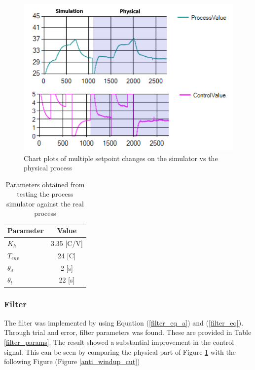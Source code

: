 \documentclass[conference]{IEEEtran}
\begin{document}
\begin{figure}[H]
    \centering
    \includegraphics[scale=0.4]{media/sim_vs_real.png}
    \caption{Chart plots of multiple setpoint changes on the simulator vs the physical process}
    \label{sim_vs_real}
\end{figure}

\begin{table}[H]
    \centering
    \begin{tabular}{ |l|c| }
        \hline
        Parameter & Value \\ 
        \hline \hline
        $K_h$ & 3.35 [C/V]\\
        $T_{env}$ & 24 [C]\\
        $\theta_d$ & 2 [s]\\
        $\theta_t$ & 22 [s]\\
        \hline
    \end{tabular}
    \vspace{5pt}
    \caption{Parameters obtained from testing the process simulator against the real process}
    \label{air_heat_model_params}
\end{table}

\subsubsection{Filter}
The filter was implemented by using Equation (\ref{filter_eq_a}) and (\ref{filter_eq}). Through trial and error, filter parameters was found. These are provided in Table \ref{filter_params}. The result showed a substantial improvement in the control signal. This can be seen by comparing the physical part of Figure \ref{sim_vs_real} with the following Figure (Figure \ref{anti_windup_cut})
\end{document}
